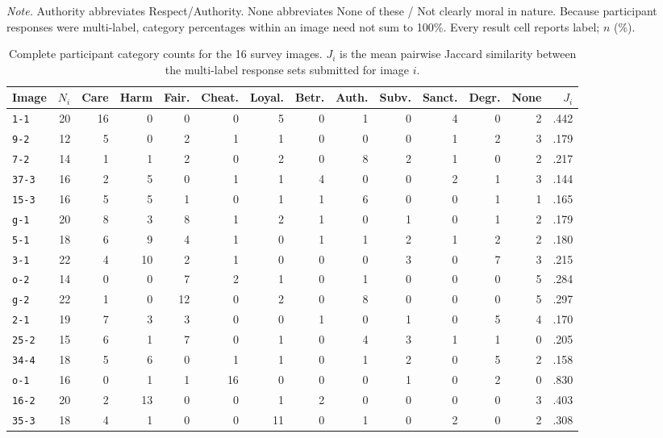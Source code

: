 \begin{table}[!htbp]
    \vspace{2mm}
    \parbox{0.98\textwidth}{\footnotesize
    \textit{Note.} Authority abbreviates Respect/Authority. None abbreviates
    None of these / Not clearly moral in nature. Because participant responses
    were multi-label, category percentages within an image need not sum to
    100\%. Every result cell reports label; \(n\) (\%).}
\end{table}

\begin{table}[p]
    \centering
    \caption[Complete participant category counts by image.]{Complete
    participant category counts for the 16 survey images. \(J_i\) is the mean
    pairwise Jaccard similarity between the multi-label response sets submitted
    for image \(i\).}
    \label{tab:participant_distributions}
    \footnotesize
    \setlength{\tabcolsep}{4pt}
    \renewcommand{\arraystretch}{1.12}
    \begin{tabular}{@{}l*{13}{r}@{}}
        \toprule
        Image & \(N_i\) & Care & Harm & Fair. & Cheat. & Loyal. &
        Betr. & Auth. & Subv. & Sanct. & Degr. & None & \(J_i\) \\
        \midrule
        \texttt{1-1}  & 20 & 16 & 0  & 0  & 0  & 5  & 0 & 1 & 0 & 4 & 0 & 2 & .442 \\
        \texttt{9-2}  & 12 & 5  & 0  & 2  & 1  & 1  & 0 & 0 & 0 & 1 & 2 & 3 & .179 \\
        \texttt{7-2}  & 14 & 1  & 1  & 2  & 0  & 2  & 0 & 8 & 2 & 1 & 0 & 2 & .217 \\
        \texttt{37-3} & 16 & 2  & 5  & 0  & 1  & 1  & 4 & 0 & 0 & 2 & 1 & 3 & .144 \\
        \texttt{15-3} & 16 & 5  & 5  & 1  & 0  & 1  & 1 & 6 & 0 & 0 & 1 & 1 & .165 \\
        \texttt{g-1}  & 20 & 8  & 3  & 8  & 1  & 2  & 1 & 0 & 1 & 0 & 1 & 2 & .179 \\
        \texttt{5-1}  & 18 & 6  & 9  & 4  & 1  & 0  & 1 & 1 & 2 & 1 & 2 & 2 & .180 \\
        \texttt{3-1}  & 22 & 4  & 10 & 2  & 1  & 0  & 0 & 0 & 3 & 0 & 7 & 3 & .215 \\
        \texttt{o-2}  & 14 & 0  & 0  & 7  & 2  & 1  & 0 & 1 & 0 & 0 & 0 & 5 & .284 \\
        \texttt{g-2}  & 22 & 1  & 0  & 12 & 0  & 2  & 0 & 8 & 0 & 0 & 0 & 5 & .297 \\
        \texttt{2-1}  & 19 & 7  & 3  & 3  & 0  & 0  & 1 & 0 & 1 & 0 & 5 & 4 & .170 \\
        \texttt{25-2} & 15 & 6  & 1  & 7  & 0  & 1  & 0 & 4 & 3 & 1 & 1 & 0 & .205 \\
        \texttt{34-4} & 18 & 5  & 6  & 0  & 1  & 1  & 0 & 1 & 2 & 0 & 5 & 2 & .158 \\
        \texttt{o-1}  & 16 & 0  & 1  & 1  & 16 & 0  & 0 & 0 & 1 & 0 & 2 & 0 & .830 \\
        \texttt{16-2} & 20 & 2  & 13 & 0  & 0  & 1  & 2 & 0 & 0 & 0 & 0 & 3 & .403 \\
        \texttt{35-3} & 18 & 4  & 1  & 0  & 0  & 11 & 0 & 1 & 0 & 2 & 0 & 2 & .308 \\
        \bottomrule
    \end{tabular}


\end{table}

